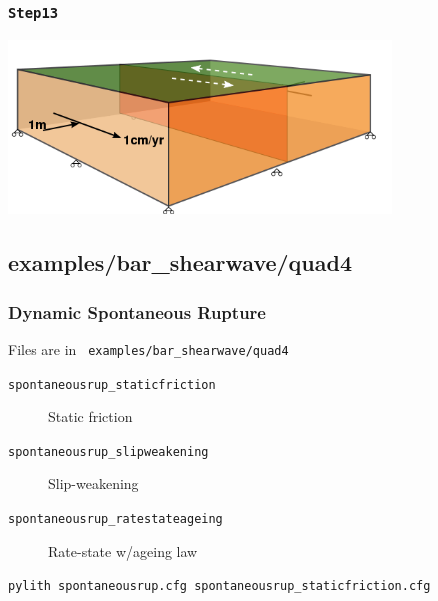 \documentclass{beamer}
\begin{document}
\begin{frame}
  \frametitle{{\tt Step13}}
  
  \begin{center}
    \includegraphics[width=4.0in]{figs/step13_schematic}
  \end{center}
  
\end{frame}


\subsection{examples/bar\_shearwave/quad4}

\begin{frame}
  \frametitle{Dynamic Spontaneous Rupture}
  
  \vfill
  Files are in {\tt\color{red} examples/bar\_shearwave/quad4}
  \vfill

  \begin{description}
  \item[{\tt spontaneousrup\_staticfriction}] Static friction
  \item[{\tt spontaneousrup\_slipweakening}] Slip-weakening
  \item[{\tt spontaneousrup\_ratestateageing}] Rate-state w/ageing law
  \end{description}
  
  \vfill
  {\tt pylith spontaneousrup.cfg spontaneousrup\_staticfriction.cfg}
  \vfill

\end{frame}
\end{document}
